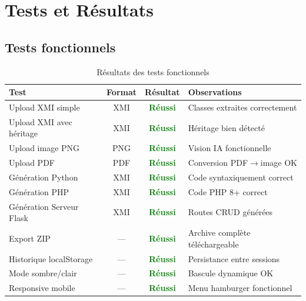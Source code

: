 \section{Tests et Résultats}

\subsection{Tests fonctionnels}

\begin{table}[htbp]
\centering
\renewcommand{\arraystretch}{1.4}
\begin{tabular}{|l|c|c|p{4cm}|}
\hline
\rowcolor{gray!30}
\textbf{Test} & \textbf{Format} & \textbf{Résultat} & \textbf{Observations} \\
\hline
Upload XMI simple & XMI & \textcolor{green}{\textbf{Réussi}} & Classes extraites correctement \\
\hline
Upload XMI avec héritage & XMI & \textcolor{green}{\textbf{Réussi}} & Héritage bien détecté \\
\hline
Upload image PNG & PNG & \textcolor{green}{\textbf{Réussi}} & Vision IA fonctionnelle \\
\hline
Upload PDF & PDF & \textcolor{green}{\textbf{Réussi}} & Conversion PDF$\rightarrow$image OK \\
\hline
Génération Python & XMI & \textcolor{green}{\textbf{Réussi}} & Code syntaxiquement correct \\
\hline
Génération PHP & XMI & \textcolor{green}{\textbf{Réussi}} & Code PHP 8+ correct \\
\hline
Génération Serveur Flask & XMI & \textcolor{green}{\textbf{Réussi}} & Routes CRUD générées \\
\hline
Export ZIP & --- & \textcolor{green}{\textbf{Réussi}} & Archive complète téléchargeable \\
\hline
Historique localStorage & --- & \textcolor{green}{\textbf{Réussi}} & Persistance entre sessions \\
\hline
Mode sombre/clair & --- & \textcolor{green}{\textbf{Réussi}} & Bascule dynamique OK \\
\hline
Responsive mobile & --- & \textcolor{green}{\textbf{Réussi}} & Menu hamburger fonctionnel \\
\hline
\end{tabular}
\caption{Résultats des tests fonctionnels}
\end{table}

